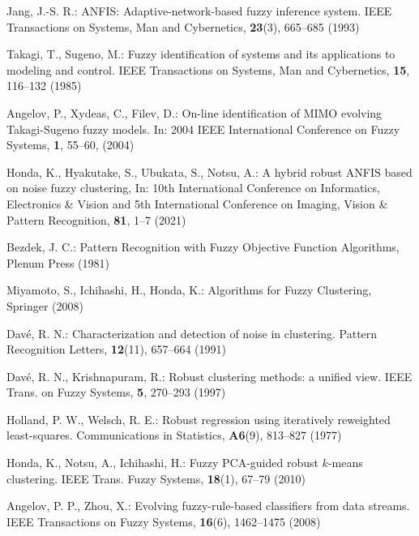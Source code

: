 \documentclass{ujarticle}
\begin{document}








\begin{thebibliography}{99}
Jang, J.-S. R.: ANFIS: Adaptive-network-based fuzzy inference system. IEEE Transactions on Systems, Man and Cybernetics, \textbf{23}(3), 665--685 (1993)

Takagi, T., Sugeno, M.: Fuzzy identification of systems and its applications to modeling and control. IEEE Transactions on Systems, Man and Cybernetics, \textbf{15}, 116--132 (1985)

Angelov, P., Xydeas, C., Filev, D.: On-line identification of MIMO evolving Takagi-Sugeno fuzzy models. In: 2004 IEEE International Conference on Fuzzy Systems, \textbf{1}, 55--60, (2004)

Honda, K., Hyakutake, S., Ubukata, S., Notsu, A.: A hybrid robust ANFIS based on noise fuzzy clustering, In: 10th International Conference on Informatics, Electronics \& Vision and 5th International Conference on Imaging, Vision \& Pattern Recognition, \textbf{81}, 1--7 (2021)

Bezdek, J. C.: Pattern Recognition with Fuzzy Objective Function Algorithms, Plenum Press (1981)

Miyamoto, S., Ichihashi, H., Honda, K.: Algorithms for Fuzzy Clustering, Springer (2008)

Dav\'e, R. N.: Characterization and detection of noise in clustering. Pattern Recognition Letters, \textbf{12}(11), 657--664 (1991)

Dav\'e, R. N., Krishnapuram, R.: Robust clustering methods: a unified view. IEEE Trans. on Fuzzy Systems, \textbf{5}, 270--293 (1997)

Holland, P. W., Welsch, R. E.: Robust regression using iteratively reweighted least-squares. Communications in Statistics, \textbf{A6}(9), 813--827 (1977)

Honda, K., Notsu, A., Ichihashi, H.: Fuzzy PCA-guided robust $k$-means clustering. IEEE Trans. Fuzzy Systems, \textbf{18}(1), 67--79 (2010)

Angelov, P. P., Zhou, X.: Evolving fuzzy-rule-based classifiers from data streams. IEEE Transactions on Fuzzy Systems, \textbf{16}(6), 1462--1475 (2008)


\end{thebibliography}
\end{document}
